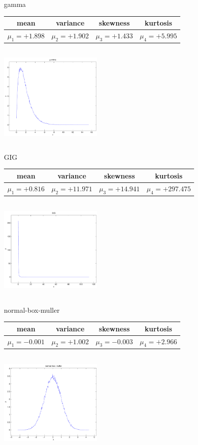 \documentclass[12pt]{article}
\theoremstyle{definition}
\theoremstyle{remark}
\numberwithin{equation}{section}
\begin{document}
\newpage
gamma \begin{tabular}{|c|c|c|c|}  mean & variance & skewness & kurtosis \\  \hline
$\mu_1 = +1.898$ & $\mu_2 = +1.902$ & $\mu_3 = +1.433$ & $\mu_4 =+5.995$ \\
\end{tabular}

\includegraphics[width=5cm,height=5cm]{gamma.pdf}

GIG \begin{tabular}{|c|c|c|c|}  mean & variance & skewness & kurtosis \\  \hline
$\mu_1 = +0.816$ & $\mu_2 = +11.971$ & $\mu_3 = +14.941$ & $\mu_4 =+297.475$ \\
\end{tabular}

\includegraphics[width=5cm,height=5cm]{GIG.pdf}

normal-box-muller \begin{tabular}{|c|c|c|c|}  mean & variance & skewness & kurtosis \\  \hline
$\mu_1 = -0.001$ & $\mu_2 = +1.002$ & $\mu_3 = -0.003$ & $\mu_4 =+2.966$ \\
\end{tabular}

\includegraphics[width=5cm,height=5cm]{normal-box-muller.pdf}
\end{document}
